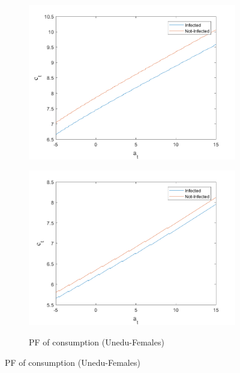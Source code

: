 \begin{figure}
\begin{subfigure}{0.5\textwidth}
   \includegraphics[width=\linewidth,height = 0.225\textheight]{figures/mio/FIG8.png}
    \label{fig_dert}
\end{subfigure}
\hspace*{\fill}
\begin{subfigure}{0.5\textwidth}\caption{PF of consumption (Unedu-Females)}
   \includegraphics[width=\linewidth,height = 0.225\textheight]{figures/mio/FIG7.png}
    \label{fig:x_b}
\end{subfigure}
\hspace*{\fill}
\end{figure}


